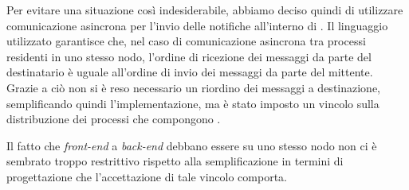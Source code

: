 Per evitare una situazione così indesiderabile, abbiamo deciso quindi di utilizzare comunicazione asincrona per l'invio delle notifiche all'interno di \evdisp{}. Il linguaggio utilizzato garantisce che, nel caso di comunicazione asincrona tra processi residenti in uno stesso nodo, l'ordine di ricezione dei messaggi da parte del destinatario è uguale all'ordine di invio dei messaggi da parte del mittente. Grazie a ciò non si è reso necessario un riordino dei messaggi a destinazione, semplificando quindi l'implementazione, ma è stato imposto un vincolo sulla distribuzione dei processi che compongono \evdisp{}.

Il fatto che \textit{front-end} a \textit{back-end} debbano essere su uno stesso nodo non ci è sembrato troppo restrittivo rispetto alla semplificazione in termini di progettazione che l'accettazione di tale vincolo comporta.
